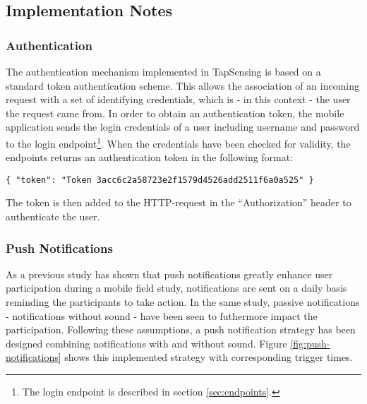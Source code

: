 \subsection{Implementation Notes}
\subsubsection{Authentication}
The authentication mechanism implemented in TapSensing is based on a standard token authentication scheme. This allows the association of an incoming request with a set of identifying credentials, which is - in this context - the user the request came from. In order to obtain an authentication token, the mobile application sends the login credentials of a user including username and password to the login endpoint\footnote{The login endpoint is described in section \ref{sec:endpoints}.}. When the credentials have been checked for validity, the endpoints returns an authentication token in the following format:
\begin{verbatim}
{ "token": "Token 3acc6c2a58723e2f1579d4526add2511f6a0a525" }
\end{verbatim}
The token is then added to the HTTP-request in the ``Authorization'' header to authenticate the user.

\subsubsection{Push Notifications}
As a previous study has shown that push notifications greatly enhance user participation \cite{pushNot} during a mobile field study, notifications are sent on a daily basis reminding the participants to take action. In the same study\cite{pushNot}, passive notifications - notifications without sound - have been seen to futhermore impact the participation. Following these assumptions, a push notification strategy has been designed combining notifications with and without sound. Figure \ref{fig:push-notifications} shows this implemented strategy with corresponding trigger times. \\

